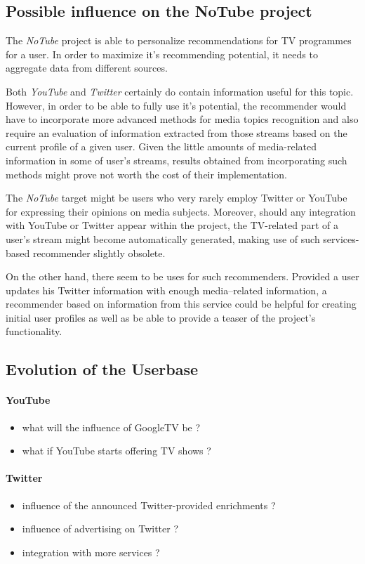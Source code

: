 \subsection{Possible influence on the NoTube project}

The \textit{NoTube} project is able to personalize recommendations for TV programmes for a user. In order to maximize
it's recommending potential, it needs to aggregate data from different sources.

Both \textit{YouTube} and \textit{Twitter} certainly do contain information useful for this topic. However, in order to be
able to fully use it's potential, the recommender would have to incorporate more advanced methods for media topics
recognition and also require an evaluation of information extracted from those streams based on the current profile
of a given user. Given the little amounts of media-related information in some of user's streams, results obtained from incorporating such methods might prove not worth the cost of their implementation.

The \textit{NoTube} target might be users who very rarely employ Twitter or YouTube for expressing their
opinions on media subjects. Moreover, should any integration with YouTube or Twitter appear within the project, the TV-related
part of a user's stream might become automatically generated, making use of such services-based recommender slightly obsolete.

On the other hand, there seem to be uses for such recommenders. Provided a user updates his Twitter information with enough
media--related information, a recommender based on information from this service could be helpful for creating initial
user profiles as well as be able to provide a teaser of the project's functionality.

\subsection{Evolution of the Userbase}
\paragraph{YouTube}
\begin{itemize}
  \item what will the influence of GoogleTV be ?
  \item what if YouTube starts offering TV shows ?
\end{itemize}

\paragraph{Twitter}
\begin{itemize}
  \item influence of the announced Twitter-provided enrichments ?
  \item influence of advertising on Twitter ?
  \item integration with more services ?
\end{itemize}

